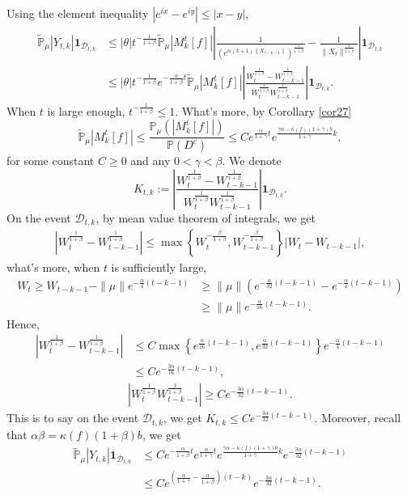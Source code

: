 \documentclass[12pt,oneside,english]{amsart}
\theoremstyle{plain}
\theoremstyle{definition}
\numberwithin{equation}{section}
\begin{document}
    Using the element inequality $|e^{ix}-e^{iy}|\leq|x-y|$,
    \begin{align*}
        \mathbb{\tilde{P}}_{\mu}|Y_{t,k}|\mathbf{1}_{\mathcal{D}_{t,k}}&\leq|\theta|t^{-\frac{1}{1+\beta}}\mathbb{\tilde{P}}_{\mu}|M_k^t[f]|\left|\frac{1}{\left(e^{\alpha(k+1)\|X_{t-k-1}\|}\right)^{\frac{1}{1+\beta}}}-\frac{1}{\|X_t\|^{\frac{1}{1+\beta}}}\right|\mathbf{1}_{\mathcal{D}_{t,k}}\\
        &\leq|\theta|t^{-\frac{1}{1+\beta}}e^{-\frac{\alpha}{1+\beta}t}\mathbb{\tilde{P}}_{\mu}|M_k^t[f]|\left|\frac{W_t^{\frac{1}{1+\beta}}-W_{t-k-1}^{\frac{1}{1+\beta}}}{W_t^{\frac{1}{1+\beta}}W_{t-k-1}^{\frac{1}{1+\beta}}}\right|\mathbf{1}_{\mathcal{D}_{t,k}}.
    \end{align*}
    When $t$ is large enough, $t^{-\frac{1}{1+\beta}}\leq 1$. What's more, by Corollary \ref{cor27}
    $$\mathbb{\tilde{P}}_{\mu}|M_k^t[f]|\leq \frac{\mathbb{P}_{\mu}(|M_k^t[f]|)}{\mathbb{P}(D^c)}\leq C e^{\frac{\alpha}{1+\gamma}t}e^{\frac{\gamma \alpha-\kappa(f)(1+\gamma)b}{1+\gamma}k},$$
for some constant $C \geq 0$ and any $0<\gamma<\beta$.
We denote
$$K_{t,k}:=\left|\frac{W_t^{\frac{1}{1+\beta}}-W_{t-k-1}^{\frac{1}{1+\beta}}}{W_t^{\frac{1}{1+\beta}}W_{t-k-1}^{\frac{1}{1+\beta}}}\right|\mathbf{1}_{\mathcal{D}_{t,k}}.$$
 On the event $\mathcal{D}_{t,k}$, by mean value theorem of integrals, we get
 \begin{align*}
     \left|W_t^{\frac{1}{1+\beta}}-W_{t-k-1}^{\frac{1}{1+\beta}}\right|\leq \max \left\{W_t^{-\frac{\beta}{1+\beta}},W_{t-k-1}^{-\frac{\beta}{1+\beta}}\right\}\left|W_t-W_{t-k-1}\right|,
 \end{align*}
 what's more, when $t$ is sufficiently large,
 \begin{align*}
     W_t\geq W_{t-k-1}-\|\mu\| e^{-\frac{\alpha}{4}(t-k-1)}&\geq\|\mu\|\left(e^{-\frac{\alpha}{32}(t-k-1)}-e^{-\frac{\alpha}{4}(t-k-1)}\right)\\
     &\geq \|\mu\| e^{-\frac{\alpha}{16}(t-k-1)}.
 \end{align*}
Hence,
\begin{align*}
    \left|W_t^{\frac{1}{1+\beta}}-W_{t-k-1}^{\frac{1}{1+\beta}}\right|&\leq C \max\left\{e^{\frac{\alpha}{16}(t-k-1)}, e^{\frac{\alpha}{32}(t-k-1)}\right\}e^{-\frac{\alpha}{4}(t-k-1)}\\
    &\leq C e^{-\frac{3\alpha}{16}(t-k-1)},
\end{align*}
\begin{align*}
    \left|W_t^{\frac{1}{1+\beta}}W_{t-k-1}^{\frac{1}{1+\beta}}\right|\geq C e^{-\frac{3\alpha}{32}(t-k-1)}.
\end{align*}
This is to say on the event $\mathcal{D}_{t,k}$, we get $K_{t,k}\leq C e^{-\frac{3\alpha}{32}(t-k-1)}$. Moreover, recall that $\alpha\beta=\kappa(f)(1+\beta)b$, we get
\begin{align}
    \mathbb{\tilde{P}}_{\mu}|Y_{t,k}|\mathbf{1}_{\mathcal{D}_{t,k}}&\leq C e^{-\frac{\alpha}{1+\beta}t}e^{\frac{\alpha}{1+\gamma}t}e^{\frac{\gamma \alpha-\kappa(f)(1+\gamma)b}{1+\gamma}k}e^{-\frac{3\alpha}{32}(t-k-1)}\label{thm125}\\
    &\leq C e^{(\frac{\alpha}{1+\gamma}-\frac{\alpha}{1+\beta})(t-k)}e^{-\frac{3\alpha}{32}(t-k-1)}.\nonumber
\end{align}
\end{document}
